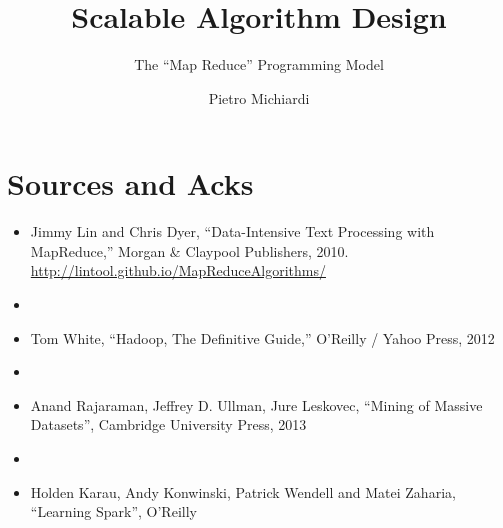 \documentclass{beamer}
\title{Scalable Algorithm Design}
\subtitle{The ``Map Reduce'' Programming Model}
\author{Pietro Michiardi}
\institute{Eurecom}
\date
\begin{document}
\begin{frame}
  \titlepage
\end{frame}

\section{Sources and Acks}

\begin{frame}
  \begin{itemize}
    \item Jimmy Lin and Chris Dyer, ``Data-Intensive Text Processing with MapReduce,'' Morgan \& Claypool Publishers, 2010. \url{http://lintool.github.io/MapReduceAlgorithms/}

    \item[]

    \item Tom White, ``Hadoop, The Definitive Guide,'' O'Reilly / Yahoo Press, 2012

    \item[]

    \item Anand Rajaraman, Jeffrey D. Ullman, Jure Leskovec, ``Mining of Massive Datasets'', Cambridge University Press, 2013

    \item[]

    \item Holden Karau, Andy Konwinski, Patrick Wendell and Matei Zaharia, ``Learning Spark'', O'Reilly
  \end{itemize}
\end{frame}


\end{document}
